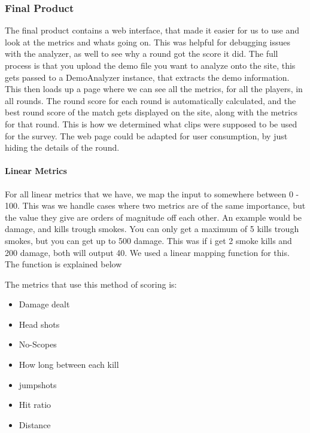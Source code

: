 \subsubsection{Final Product}

The final product contains a web interface, that made it easier for us to use and look at the metrics and whats going on. This was helpful for debugging issues with the analyzer, as well to see why a round got the score it did. The full process is that you upload the demo file you want to analyze onto the site, this gets passed to a DemoAnalyzer instance, that extracts the demo information. This then loads up a page where we can see all the metrics, for all the players, in all rounds. The round score for each round is automatically calculated, and the best round score of the match gets displayed on the site, along with the metrics for that round. This is how we determined what clips were supposed to be used for the survey. The web page could be adapted for user consumption, by just hiding the details of the round.

\paragraph{Linear Metrics}
For all linear metrics that we have, we map the input to somewhere between 0 - 100. This was we handle cases where two metrics are of the same importance, but the value they give are orders of magnitude off each other. An example would be damage, and kills trough smokes. You can only get a maximum of 5 kills trough smokes, but you can get up to 500 damage. This was if i get 2 smoke kills and 200 damage, both will output 40. We used a linear mapping function for this. The function is explained below

The metrics that use this method of scoring is:
\begin{itemize}
    \item Damage dealt
    \item Head shots
    \item No-Scopes
    \item How long between each kill
    \item \Gls{jumpshot}s
    \item Hit ratio
    \item Distance
\end{itemize}

